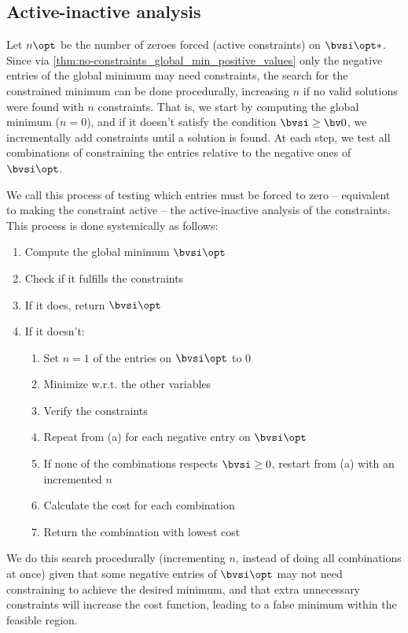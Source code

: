 \subsection{Active-inactive analysis}
\label{app:appC:active-inactive_analysis}

Let $n\opt$ be the number of zeroes forced (active constraints) on $\bvsi\opt*$. Since via \cref{thm:no-constraints_global_min_positive_values} only the negative entries of the global minimum may need constraints, the search for the constrained minimum can be done procedurally, increasing $n$ if no valid solutions were found with $n$ constraints. That is, we start by computing the global minimum ($n = 0$), and if it doesn't satisfy the condition $\bvsi \geq \bv0$, we incrementally add constraints until a solution is found. At each step, we test all combinations of constraining the entries relative to the negative ones of $\bvsi\opt$. 

We call this process of testing which entries must be forced to zero -- equivalent to making the constraint active -- the active-inactive analysis of the constraints. This process is done systemically as follows:
\begin{enumerate}
	\item Compute the global minimum $\bvsi\opt$
	\item Check if it fulfills the constraints
	\item If it does, return $\bvsi\opt$
	\item If it doesn't:
	\begin{enumerate}
		\item Set $n=1$ of the entries on $\bvsi\opt$ to $0$
		\item Minimize w.r.t. the other variables
		\item Verify the constraints
		\item Repeat from (a) for each negative entry on $\bvsi\opt$
		\item If none of the combinations respects $\bvsi\geq0$, restart from (a) with an incremented $n$
		\item Calculate the cost for each combination
		\item Return the combination with lowest cost
	\end{enumerate}
\end{enumerate}

We do this search procedurally (incrementing $n$, instead of doing all combinations at once) given that some negative entries of $\bvsi\opt$ may not need constraining to achieve the desired minimum, and that extra unnecessary constraints will increase the cost function, leading to a false minimum within the feasible region.